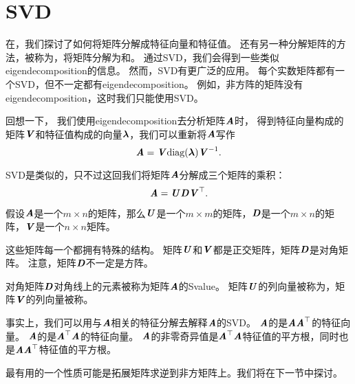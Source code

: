 \section{\gls{SVD}}
\label{sec:singular_value_decomposition}

在，我们探讨了如何将矩阵分解成特征向量和特征值。
还有另一种分解矩阵的方法，被称为，将矩阵分解为和。
通过\gls{SVD}，我们会得到一些类似\gls{eigendecomposition}的信息。
然而，\gls{SVD}有更广泛的应用。
每个实数矩阵都有一个\gls{SVD}，但不一定都有\gls{eigendecomposition}。
例如，非方阵的矩阵没有\gls{eigendecomposition}，这时我们只能使用\gls{SVD}。


回想一下， 我们使用\gls{eigendecomposition}去分析矩阵$\MA$时， 得到特征向量构成的矩阵$\MV$和特征值构成的向量$\Vlambda$，我们可以重新将$\MA$写作
\begin{equation}
    \MA=\MV\text{diag}(\Vlambda)\MV^{-1}.
\end{equation}

\gls{SVD}是类似的，只不过这回我们将矩阵$\MA$分解成三个矩阵的乘积：
\begin{equation}
    \MA=\MU\MD\MV^\top.
\end{equation}


假设$\MA$是一个$m\times n$的矩阵，那么$\MU$是一个$m\times m$的矩阵，$\MD$是一个$m\times n$的矩阵，$\MV$是一个$n\times n$矩阵。



这些矩阵每一个都拥有特殊的结构。
矩阵$\MU$和$\MV$都是正交矩阵，矩阵$\MD$是对角矩阵。
注意，矩阵$\MD$不一定是方阵。


对角矩阵$\MD$对角线上的元素被称为矩阵$\MA$的\gls{Svalue}。
矩阵$\MU$的列向量被称为，矩阵$\MV$的列向量被称。


事实上，我们可以用与$\MA$相关的特征分解去解释$\MA$的\gls{SVD}。
$\MA$的是$\MA\MA^\top$的特征向量。
$\MA$的是$\MA^\top\MA$的特征向量。
$\MA$的非零奇异值是$\MA^\top\MA$特征值的平方根，同时也是$\MA\MA^\top$特征值的平方根。


最有用的一个性质可能是拓展矩阵求逆到非方矩阵上。我们将在下一节中探讨。




\section{}
\label{sec:the_moore_penrose_pseudoinverse}


